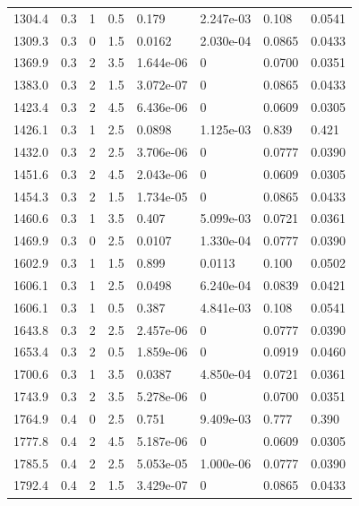 \documentclass[preview]{standalone}
\begin{document}
{{{\begin{tabular}{L{1.2cm}C{1.2cm} C{0.3cm}C{0.5cm} C{1.4cm}C{1.4cm} C{1.4cm}C{1.4cm}}
  1304.4  &   0.3  & 1     & 0.5 &  0.179  & 2.247e-03  & 0.108 &  0.0541   \\ 
  1309.3  &   0.3  & 0     & 1.5 &  0.0162  & 2.030e-04  & 0.0865 &  0.0433   \\ 
  1369.9  &   0.3  & 2     & 3.5 &  1.644e-06  & 0  & 0.0700 &  0.0351   \\ 
  1383.0  &   0.3  & 2     & 1.5 &  3.072e-07  & 0  & 0.0865 &  0.0433   \\ 
  1423.4  &   0.3  & 2     & 4.5 &  6.436e-06  & 0  & 0.0609 &  0.0305   \\ 
  1426.1  &   0.3  & 1     & 2.5 &  0.0898  & 1.125e-03  & 0.839 &  0.421   \\ 
  1432.0  &   0.3  & 2     & 2.5 &  3.706e-06  & 0  & 0.0777 &  0.0390   \\ 
  1451.6  &   0.3  & 2     & 4.5 &  2.043e-06  & 0  & 0.0609 &  0.0305   \\ 
  1454.3  &   0.3  & 2     & 1.5 &  1.734e-05  & 0  & 0.0865 &  0.0433   \\ 
  1460.6  &   0.3  & 1     & 3.5 &  0.407  & 5.099e-03  & 0.0721 &  0.0361   \\ 
  1469.9  &   0.3  & 0     & 2.5 &  0.0107  & 1.330e-04  & 0.0777 &  0.0390   \\ 
  1602.9  &   0.3  & 1     & 1.5 &  0.899  & 0.0113  & 0.100 &  0.0502   \\ 
  1606.1  &   0.3  & 1     & 2.5 &  0.0498  & 6.240e-04  & 0.0839 &  0.0421   \\ 
  1606.1  &   0.3  & 1     & 0.5 &  0.387  & 4.841e-03  & 0.108 &  0.0541   \\ 
  1643.8  &   0.3  & 2     & 2.5 &  2.457e-06  & 0  & 0.0777 &  0.0390   \\ 
  1653.4  &   0.3  & 2     & 0.5 &  1.859e-06  & 0  & 0.0919 &  0.0460   \\ 
  1700.6  &   0.3  & 1     & 3.5 &  0.0387  & 4.850e-04  & 0.0721 &  0.0361   \\ 
  1743.9  &   0.3  & 2     & 3.5 &  5.278e-06  & 0  & 0.0700 &  0.0351   \\ 
  1764.9  &   0.4  & 0     & 2.5 &  0.751  & 9.409e-03  & 0.777 &  0.390   \\ 
  1777.8  &   0.4  & 2     & 4.5 &  5.187e-06  & 0  & 0.0609 &  0.0305   \\ 
  1785.5  &   0.4  & 2     & 2.5 &  5.053e-05  & 1.000e-06  & 0.0777 &  0.0390   \\ 
  1792.4  &   0.4  & 2     & 1.5 &  3.429e-07  & 0  & 0.0865 &  0.0433   \\ 

\end{tabular}}}}
\end{document}
